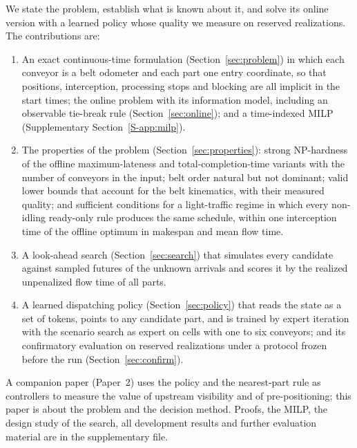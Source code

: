 \documentclass[11pt,a4paper]{article}
\theoremstyle{plain}
\theoremstyle{definition}
\theoremstyle{remark}
\newcommand{\Supp}[1]{Supplementary Section~\ref{S-#1}}
\begin{document}
We state the problem, establish what is known about it, and solve its online version with
a learned policy whose quality we measure on reserved realizations. The contributions are:
\begin{enumerate}[nosep]
\item An exact continuous-time formulation (Section~\ref{sec:problem}) in which each
  conveyor is a belt odometer and each part one entry coordinate, so that positions,
  interception, processing stops and blocking are all implicit in the start times; the
  online problem with its information model, including an observable tie-break rule
  (Section~\ref{sec:online}); and a time-indexed MILP (\Supp{app:milp}).
\item The properties of the problem (Section~\ref{sec:properties}): strong NP-hardness of
  the offline maximum-lateness and total-completion-time variants with the number of
  conveyors in the input; belt order natural but not dominant; valid lower bounds that
  account for the belt kinematics, with their measured quality; and sufficient conditions
  for a light-traffic regime in which every non-idling ready-only rule produces the same
  schedule, within one interception time of the offline optimum in makespan and mean flow
  time.
\item A look-ahead search (Section~\ref{sec:search}) that simulates every candidate against
  sampled futures of the unknown arrivals and scores it by the realized unpenalized flow
  time of all parts.
\item A learned dispatching policy (Section~\ref{sec:policy}) that reads the state as a set
  of tokens, points to any candidate part, and is trained by expert iteration with the
  scenario search as expert on cells with one to six conveyors; and its confirmatory
  evaluation on reserved realizations under a protocol frozen before the run
  (Section~\ref{sec:confirm}).
\end{enumerate}
A companion paper (Paper~2) uses the policy and the nearest-part rule as controllers to
measure the value of upstream visibility and of pre-positioning; this paper is about the
problem and the decision method. Proofs, the MILP, the design study of the search, all
development results and further evaluation material are in the supplementary file.

\end{document}
